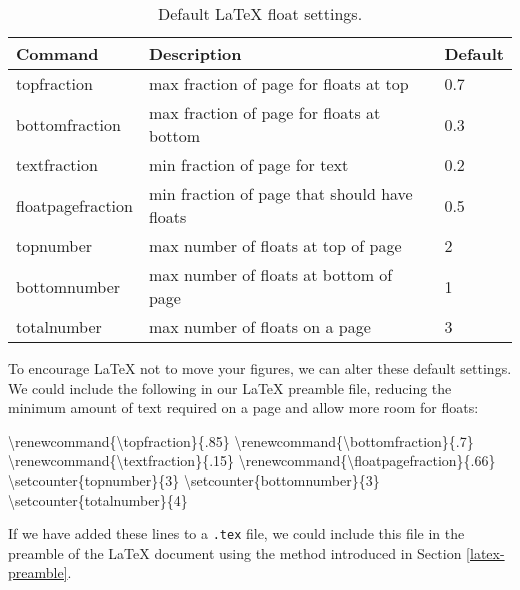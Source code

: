 \documentclass[
  11pt,
]{krantz}
\newenvironment{Shaded}{\begin{snugshade}}{\end{snugshade}}
\newcommand{\ExtensionTok}[1]{#1}
\newcommand{\FunctionTok}[1]{\textcolor[rgb]{0,0,0}{#1}}
\newcommand{\NormalTok}[1]{#1}
\begin{document}
\begin{table}

\caption{\label{tab:float-default}Default LaTeX float settings.}
\centering
\begin{tabular}[t]{l|l|l}
\hline
Command & Description & Default\\
\hline
topfraction & max fraction of page for floats at top & 0.7\\
\hline
bottomfraction & max fraction of page for floats at bottom & 0.3\\
\hline
textfraction & min fraction of page for text & 0.2\\
\hline
floatpagefraction & min fraction of page that should have floats & 0.5\\
\hline
topnumber & max number of floats at top of page & 2\\
\hline
bottomnumber & max number of floats at bottom of page & 1\\
\hline
totalnumber & max number of floats on a page & 3\\
\hline
\end{tabular}
\end{table}

To encourage LaTeX not to move your figures, we can alter these default settings. We could include the following in our LaTeX preamble file, reducing the minimum amount of text required on a page and allow more room for floats:

\begin{Shaded}
\begin{Highlighting}[]
\FunctionTok{\textbackslash{}renewcommand}\NormalTok{\{}\ExtensionTok{\textbackslash{}topfraction}\NormalTok{\}\{.85\}}
\FunctionTok{\textbackslash{}renewcommand}\NormalTok{\{}\ExtensionTok{\textbackslash{}bottomfraction}\NormalTok{\}\{.7\}}
\FunctionTok{\textbackslash{}renewcommand}\NormalTok{\{}\ExtensionTok{\textbackslash{}textfraction}\NormalTok{\}\{.15\}}
\FunctionTok{\textbackslash{}renewcommand}\NormalTok{\{}\ExtensionTok{\textbackslash{}floatpagefraction}\NormalTok{\}\{.66\}}
\FunctionTok{\textbackslash{}setcounter}\NormalTok{\{topnumber\}\{3\}}
\FunctionTok{\textbackslash{}setcounter}\NormalTok{\{bottomnumber\}\{3\}}
\FunctionTok{\textbackslash{}setcounter}\NormalTok{\{totalnumber\}\{4\}}
\end{Highlighting}
\end{Shaded}

If we have added these lines to a \texttt{.tex} file, we could include this file in the preamble of the LaTeX document using the method introduced in Section \ref{latex-preamble}.
\end{document}
